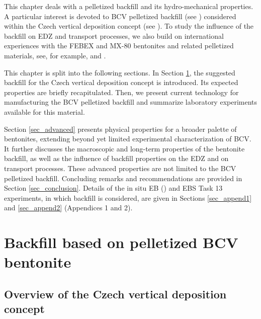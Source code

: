 


This chapter deals with a pelletized backfill and its hydro-mechanical properties. A particular interest is devoted to \acrshort{BCV} pelletized backfill (see \cite{Stastka2020navrh}) considered within the Czech vertical deposition concept (see \cite{Hausmannova2023technical}). To study the influence of the backfill on \Gls{EDZ} and transport processes, we also build on international experiences with the FEBEX and MX-80 bentonites and related pelletized materials, see, for example, \cite{Hoffmann2007hydro} and \cite{BernachyBarbe2022beacon}.

This chapter is split into the following sections. In Section \ref{sec_concept}, the suggested backfill for the Czech vertical deposition concept is introduced. Its expected properties are briefly recapitulated. Then, we present current technology for manufacturing the \acrshort{BCV} pelletized backfill and summarize laboratory experiments available for this material. 

Section \ref{sec_advanced} presents physical properties for a broader palette of bentonites, extending beyond yet limited experimental characterization of \acrshort{BCV}. It further discusses the macroscopic and long-term properties of the bentonite backfill, as well as the influence of backfill properties on the \Gls{EDZ} and on transport processes. These advanced properties are not limited to the \acrshort{BCV} pelletized backfill. Concluding remarks and recommendations are provided in Section \ref{sec_conclusion}. 
Details of the in situ EB (\cite{SchusterEtAl2014_PEBS_D2_1_1_EB}) and EBS Task 13 experiments, in which backfill is considered, are given in Sections \ref{sec_append1} and \ref{sec_append2} (Appendices 1 and 2).

\section{Backfill based on pelletized BCV bentonite}
\label{sec_concept}

\subsection{Overview of the Czech vertical deposition concept}

